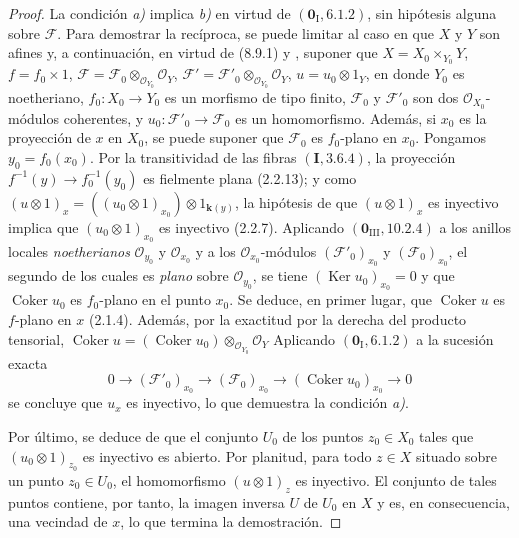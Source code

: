 \begin{proof}
La condición \emph{a)} implica \emph{b)} en virtud de $(\mathbf 0_{\mathrm I},6.1.2)$, sin hipótesis alguna sobre $\mathcal F$. Para demostrar la recíproca, se puede limitar al caso en que $X$ y $Y$ son afines y, a continuación, en virtud de (8.9.1) y , suponer que
$X=X_0\times_{Y_0}Y$, $f=f_0\times1$,
$\mathcal F=\mathcal F_0\otimes_{\mathcal O_{Y_0}}\mathcal O_Y$,
$\mathcal F'=\mathcal F'_0\otimes_{\mathcal O_{Y_0}}\mathcal O_Y$, $u=u_0\otimes1_Y$,
en donde $Y_0$ es noetheriano, $f_0:X_0\to Y_0$ es un morfismo de tipo finito, $\mathcal F_0$ y $\mathcal F'_0$ son dos $\mathcal O_{X_0}$-módulos coherentes, y $u_0:\mathcal F'_0\to\mathcal F_0$ es un homomorfismo. Además, si $x_0$ es la proyección de $x$ en $X_0$, se puede suponer que $\mathcal F_0$ es $f_0$-plano en $x_0$. Pongamos $y_0=f_0(x_0)$. Por la transitividad de las fibras $(\mathbf I,3.6.4)$, la proyección $f^{-1}(y)\to f_0^{-1}(y_0)$ es fielmente plana (2.2.13); y como
$(u\otimes1)_x=((u_0\otimes1)_{x_0})\otimes1_{\mathbf{k}(y)}$,
la hipótesis de que $(u\otimes1)_x$ es inyectivo implica que $(u_0\otimes1)_{x_0}$ es inyectivo (2.2.7). Aplicando $(\mathbf 0_{\mathrm{III}},10.2.4)$ a los anillos locales \emph{noetherianos} $\mathcal O_{y_0}$ y $\mathcal O_{x_0}$ y a los $\mathcal O_{x_0}$-módulos $(\mathcal F'_0)_{x_0}$ y $(\mathcal F_0)_{x_0}$, el segundo de los cuales es \emph{plano} sobre $\mathcal O_{y_0}$, se tiene
$(\operatorname{Ker}u_0)_{x_0}=0$ y que $\operatorname{Coker}u_0$ es
$f_0$-plano en el punto $x_0$.
Se deduce, en primer lugar, que $\operatorname{Coker}u$ es $f$-plano en $x$ (2.1.4). Además, por la exactitud por la derecha del producto tensorial,
$\operatorname{Coker}u=(\operatorname{Coker}u_0)
 \otimes_{\mathcal O_{Y_0}}\mathcal O_Y$
Aplicando $(\mathbf 0_{\mathrm I},6.1.2)$ a la sucesión exacta
\[
0\longrightarrow(\mathcal F'_0)_{x_0}\longrightarrow
(\mathcal F_0)_{x_0}\longrightarrow(\operatorname{Coker}u_0)_{x_0}
\longrightarrow0
\]
se concluye que $u_x$ es inyectivo, lo que demuestra la condición \emph{a)}.

Por último, se deduce de  que el conjunto $U_0$ de los puntos $z_0\in X_0$ tales que $(u_0\otimes1)_{z_0}$ es inyectivo es abierto. Por planitud, para todo $z\in X$ situado sobre un punto $z_0\in U_0$, el homomorfismo $(u\otimes1)_z$ es inyectivo. El conjunto de tales puntos contiene, por tanto, la imagen inversa $U$ de $U_0$ en $X$ y es, en consecuencia, una vecindad de $x$, lo que termina la demostración.
\end{proof}


